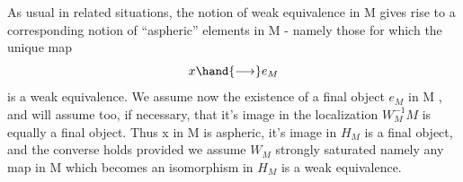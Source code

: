 As usual in related situations,  the notion of weak equivalence in
M  gives rise to a corresponding notion of ``aspheric'' elements in M -
namely those for which the unique map
\[ x \hand{\longrightarrow} e_M \]
is a weak equivalence. We assume now the existence of a final object $e_M$
in M ,  and will assume too,  if necessary,  that it's image in the
localization $W_M^{-1}M$  is equally a final object.\hand{$*$}  Thus  x in M
is aspheric,  it's image in $H_M$  is a final object,  and the converse holds
provided we assume $W_M$  strongly saturated\hand{,} namely any map in M which becomes
an isomorphism in $H_M$  is a weak equivalence.

